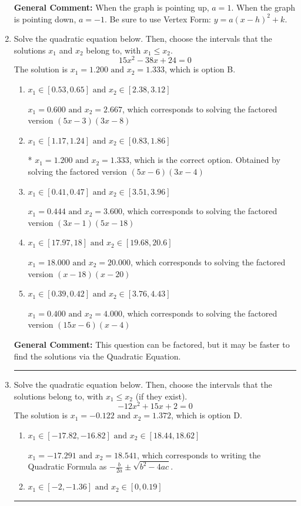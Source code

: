 \documentclass{extbook}[14pt]
\newcommand{\litem}[1]{\item #1

\rule{\textwidth}{0.4pt}}
\begin{document}
\begin{enumerate}
{\textbf{General Comment:} When the graph is pointing up, $a=1$. When the graph is pointing down, $a=-1$. Be sure to use Vertex Form: $y = a(x-h)^2+k$.
}
\litem{
Solve the quadratic equation below. Then, choose the intervals that the solutions $x_1$ and $x_2$ belong to, with $x_1 \leq x_2$.
\[ 15x^{2} -38 x + 24 = 0 \]The solution is \( x_1 = 1.200 \text{ and } x_2 = 1.333 \), which is option B.\begin{enumerate}[label=\Alph*.]
\item \( x_1 \in [0.53, 0.65] \text{ and } x_2 \in [2.38, 3.12] \)

$x_1 = 0.600 \text{ and } x_2 = 2.667$, which corresponds to solving the factored version $(5x -3)(3x -8)$
\item \( x_1 \in [1.17, 1.24] \text{ and } x_2 \in [0.83, 1.86] \)

* $x_1 = 1.200 \text{ and } x_2 = 1.333$, which is the correct option. Obtained by solving the factored version $(5x -6)(3x -4)$
\item \( x_1 \in [0.41, 0.47] \text{ and } x_2 \in [3.51, 3.96] \)

$x_1 = 0.444 \text{ and } x_2 = 3.600$, which corresponds to solving the factored version $(3x -1)(5x -18)$
\item \( x_1 \in [17.97, 18] \text{ and } x_2 \in [19.68, 20.6] \)

$x_1 = 18.000 \text{ and } x_2 = 20.000$, which corresponds to solving the factored version $(x -18)(x -20)$
\item \( x_1 \in [0.39, 0.42] \text{ and } x_2 \in [3.76, 4.43] \)

$x_1 = 0.400 \text{ and } x_2 = 4.000$, which corresponds to solving the factored version $(15x -6)(x -4)$
\end{enumerate}

\textbf{General Comment:} This question can be factored, but it may be faster to find the solutions via the Quadratic Equation.
}
\litem{
Solve the quadratic equation below. Then, choose the intervals that the solutions belong to, with $x_1 \leq x_2$ (if they exist).
\[ -12x^{2} +15 x + 2 = 0 \]The solution is \( x_1 = -0.122 \text{ and } x_2 = 1.372 \), which is option D.\begin{enumerate}[label=\Alph*.]
\item \( x_1 \in [-17.82, -16.82] \text{ and } x_2 \in [18.44, 18.62] \)

 $x_1 = -17.291 \text{ and } x_2 = 18.541$, which corresponds to writing the Quadratic Formula as $-\frac{b}{2a} \pm \sqrt{b^2 - 4ac}$.
\item \( x_1 \in [-2, -1.36] \text{ and } x_2 \in [0, 0.19] \)


\end{enumerate}}
\end{enumerate}
\end{document}
